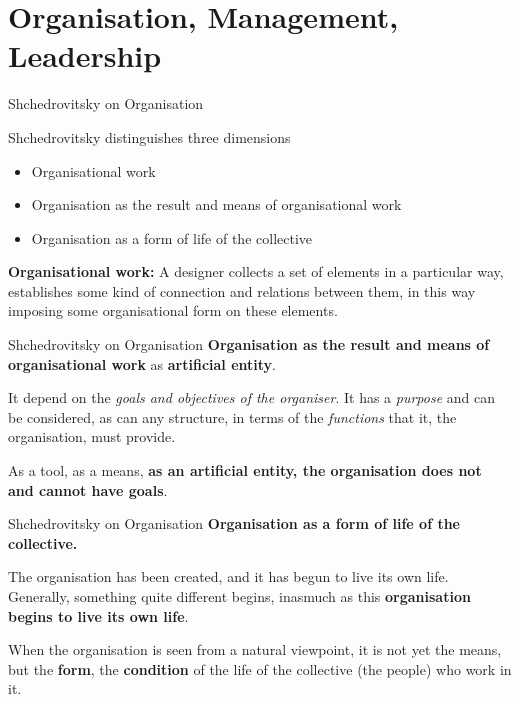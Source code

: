 \documentclass{beamer}
\begin{document}
\section{Organisation, Management, Leadership}
\begin{frame}{Shchedrovitsky on Organisation}

Shchedrovitsky distinguishes three dimensions 
\begin{itemize}[noitemsep]
\item Organisational work
\item Organisation as the result and means of organisational work
\item Organisation as a form of life of the collective
\end{itemize}

\textbf{Organisational work:} A designer collects a set of elements in a
particular way, establishes some kind of connection and relations between
them, in this way imposing some organisational form on these elements.
\end{frame}

\begin{frame}{Shchedrovitsky on Organisation}
\textbf{Organisation as the result and means of organisational work} as
\textbf{artificial entity}.

It depend on the \emph{goals and objectives of the organiser}.  It has a
\emph{purpose} and can be considered, as can any structure, in terms of the
\emph{functions} that it, the organisation, must provide.

As a tool, as a means, \textbf{as an artificial entity, the organisation does
  not and cannot have goals}.

\end{frame}

\begin{frame}{Shchedrovitsky on Organisation}
\textbf{Organisation as a form of life of the collective.}

The organisation has been created, and it has begun to live its own life.
Generally, something quite different begins, inasmuch as this
\textbf{organisation begins to live its own life}.

When the organisation is seen from a natural viewpoint, it is not yet the
means, but the \textbf{form}, the \textbf{condition} of the life of the
collective (the people) who work in it.

\end{frame}
\end{document}
